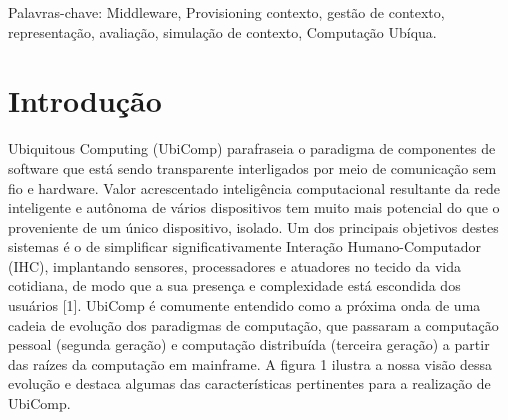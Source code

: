 \documentclass[12pt]{article} %
\begin{document}
Palavras-chave: Middleware, Provisioning contexto, gestão de contexto, representação, avaliação, simulação de contexto, Computação Ubíqua.


\section{Introdução} %


Ubiquitous Computing (UbiComp) parafraseia o paradigma de componentes de software que está sendo transparente interligados por meio de comunicação sem fio e hardware. Valor acrescentado inteligência computacional resultante da rede inteligente e autônoma de vários dispositivos tem muito mais potencial do que o proveniente de um único dispositivo, isolado. Um dos principais objetivos destes sistemas é o de simplificar significativamente Interação Humano-Computador (IHC), implantando sensores, processadores e atuadores no tecido da vida cotidiana, de modo que a sua presença e complexidade está escondida dos usuários [1]. UbiComp é comumente entendido como a próxima onda de uma cadeia de evolução dos paradigmas de computação, que passaram a computação pessoal (segunda geração) e computação distribuída (terceira geração) a partir das raízes da computação em mainframe. A figura 1 ilustra a nossa visão dessa evolução e destaca algumas das características pertinentes para a realização de UbiComp.
\end{document}
